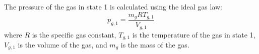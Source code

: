The pressure of the gas in state 1 is calculated using the ideal gas law:  
\[
p_{g,1} = \frac{m_g R T_{g,1}}{V_{g,1}}
\]  
where \( R \) is the specific gas constant, \( T_{g,1} \) is the temperature of the gas in state 1, \( V_{g,1} \) is the volume of the gas, and \( m_g \) is the mass of the gas.